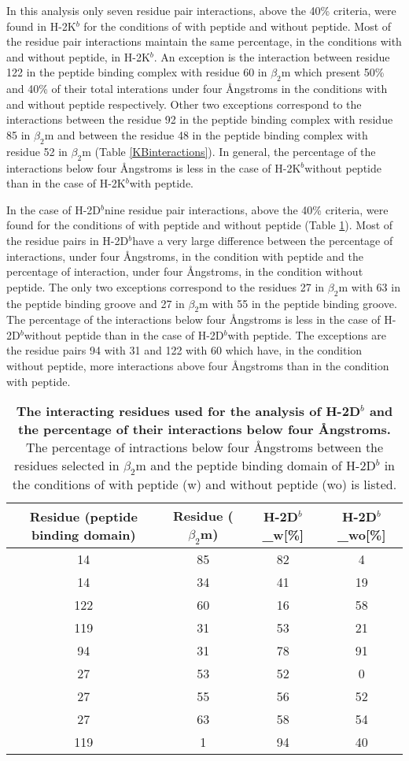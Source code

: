 \documentclass[11pt,twocolumn]{article}
\newcommand{\db}{H-2D$^{b}$}
\newcommand{\kb}{H-2K$^{b}$}
\newcommand{\4}{four {\AA}ngstroms}
\begin{document}
In this analysis only seven residue pair interactions, above the 40\% criteria, were found in H-2K$^{b}$ for the conditions of with peptide  and without peptide. Most of the residue pair interactions maintain the same percentage, in  the conditions with and without peptide, in  \kb. An exception is the interaction between  residue 122 in the peptide binding complex with residue 60 in $\beta_{2}$m which present 50\% and 40\% of their total interations under \4 in the conditions with and without peptide respectively. Other two exceptions correspond to the interactions between the residue 92  in the peptide binding complex with residue 85 in $\beta_{2}$m and between the residue 48 in the peptide binding complex with residue 52 in $\beta_{2}$m (Table \ref{KBinteractions}). In general, the percentage of the interactions below \4 is less in the case of \kb without peptide than in the case of \kb with peptide.  




In the case of \db nine residue pair interactions, above the 40\% criteria, were found for the conditions of with peptide and without peptide (Table \ref{DBinteractions}). Most of the residue pairs in \db have a very large difference between the percentage of interactions, under \4,  in the condition with peptide and the percentage of interaction, under \4, in the condition without peptide.    
The only two exceptions correspond to the residues 27 in $\beta_{2}$m with 63 in the peptide binding groove and 27 in $\beta_{2}$m with 55 in the peptide binding groove. The percentage of the interactions below \4 is less in the case of \db without peptide than in the case of \db with peptide. The exceptions are the residue pairs 94 with 31 and 122 with 60 which have, in the condition without peptide, more interactions above \4 than in the condition with peptide.  
 
 
 
\begin{table}[H]
\caption{\textbf{The interacting residues used for the analysis of H-2D$^{b}$ and the percentage of their interactions below four {\AA}ngstroms. } The percentage of intractions below four {\AA}ngstroms between the residues selected in $\beta_{2}$m and the peptide binding domain of H-2D$^{b}$ in the conditions of with peptide (w) and without peptide (wo) is listed.}
\label{DBinteractions}
\centering 
\resizebox{\linewidth}{!} {
\begin{tabular}{|c|c|c|c|}  \hline
Residue (peptide binding domain)&Residue ($\beta_{2}$m)&H-2D$^{b}${\_}w[\%]&H-2D$^{b}${\_}wo[\%]\\ \hline
14&85&82&4\\ \hline
14&34&41&19\\ \hline
122&60&16&58\\ \hline
119&31&53&21\\ \hline
94&31&78&91\\ \hline
27&53&52&0\\ \hline
27&55&56&52\\ \hline
27&63&58&54\\ \hline
119&1&94&40\\ \hline
\end{tabular}
}
\end{table}
\end{document}
